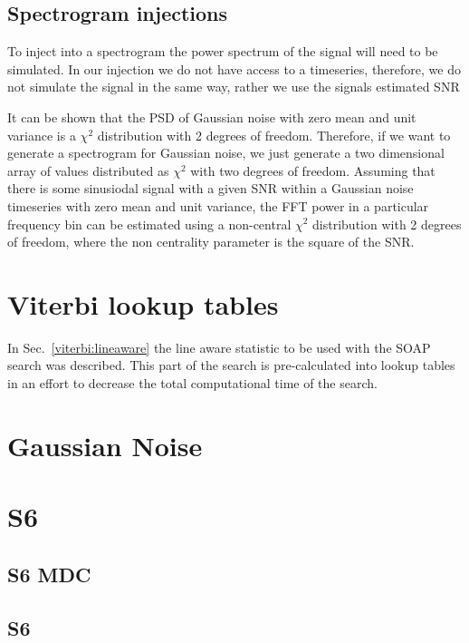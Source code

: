 \subsection{Spectrogram injections}

To inject into a spectrogram the power spectrum of the signal will need to be simulated. In our injection we do not have access to a timeseries, therefore, we do not simulate the signal in the same way, rather we use the signals estimated \ac{SNR}

It can be shown that the \ac{PSD} of Gaussian noise with zero mean and unit variance is a $\chi^2$ distribution with 2 degrees of freedom. Therefore, if we want to generate a spectrogram for Gaussian noise, we just generate a two dimensional array of values distributed as $\chi^2$ with two degrees of freedom.
Assuming that there is some sinusiodal signal with a given \ac{SNR} within a Gaussian noise timeseries with zero mean and unit variance, the \ac{FFT} power in a particular frequency bin can be estimated using a non-central $\chi^2$ distribution with 2 degrees of freedom, where the non centrality parameter is the square of the \ac{SNR}. 

\section{Viterbi lookup tables}

In Sec.~\ref{viterbi:lineaware} the line aware statistic to be used with the \ac{SOAP} search was described. This part of the search is pre-calculated into lookup tables in an effort to decrease the total computational time of the search. 

\section{Gaussian Noise}

\section{S6}

\subsection{S6 MDC}

\subsection{S6}

